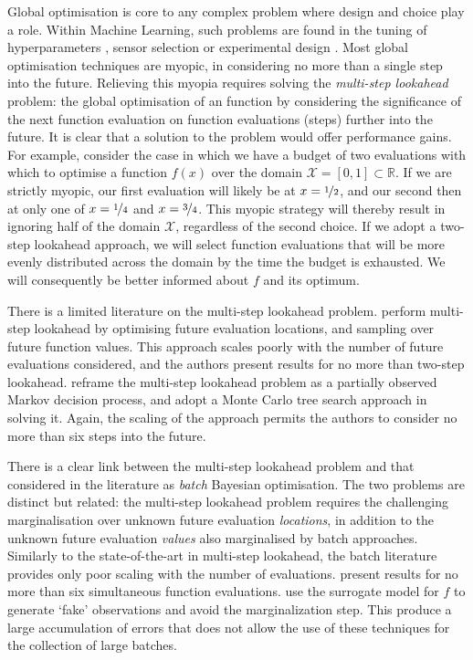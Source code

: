 \documentclass[twoside]{article}
\newcommand{\reals}{\mathbb{R}}
\newcommand{\sX}{\mathcal{X}}
\begin{document}
Global optimisation is core to any complex problem where design and choice play a role. 
Within Machine Learning, such problems are found in the tuning of hyperparameters \cite{Snoek*Larochelle*Adams_2012}, sensor selection \cite{Garnett*Osborne*Roberts_2010} or experimental design \cite{martinez-cantin_bayesian_2009}. 
Most global optimisation techniques are myopic, in considering no more than a single step into the future. 
Relieving this myopia requires solving the \emph{multi-step lookahead} problem: the global optimisation of an function by considering the significance of the next function evaluation on function evaluations (steps) further into the future. 
It is clear that a solution to the problem would offer performance gains.
For example, consider the case in which we have a budget of two evaluations with which to optimise a function $f(x)$ over the domain $\sX = [0, 1] \subset \reals$. 
If we are strictly myopic, our first evaluation will likely be at 
$x=\nicefrac{1}{2}$, and our second then at only one of $x=\nicefrac{1}{4}$ and $x=\nicefrac{3}{4}$. 
This myopic strategy will thereby result in ignoring half of the domain $\sX$, regardless of the second choice. 
If we adopt a two-step lookahead approach, we will select function evaluations that will be more evenly distributed across the domain by the time the budget is exhausted. 
We will consequently be better informed about $f$ and its optimum.

There is a limited literature on the multi-step lookahead problem.
\cite{osborne_gaussian_2009} perform multi-step lookahead by optimising future evaluation locations, and sampling over future function values. 
This approach scales poorly with the number of future evaluations considered, and the authors present results for no more than two-step lookahead.
\cite{Marchant*Ramos*Sanner*2014} reframe the multi-step lookahead problem as a partially observed Markov decision process, and adopt a Monte Carlo tree search approach in solving it. 
Again, the scaling of the approach permits the authors to consider no more than six steps into the future. 

There is a clear link between the multi-step lookahead problem and that considered in the literature as \emph{batch} Bayesian optimisation. 
The two problems are distinct but related: the multi-step lookahead problem requires the challenging marginalisation over unknown future evaluation \emph{locations}, in addition to the unknown future evaluation \emph{values} also marginalised by batch approaches. 
Similarly to the state-of-the-art in multi-step lookahead, the batch literature provides only poor scaling with the number of evaluations.
\cite{Ginsbourger2009} present results for no more than six simultaneous function evaluations.
\cite{Azimi2011,Azimi2012} use the surrogate model for $f$ to generate `fake' observations and avoid the marginalization step. 
This produce a large accumulation of errors that does not allow the use of these techniques for the collection of large batches.
\end{document}
